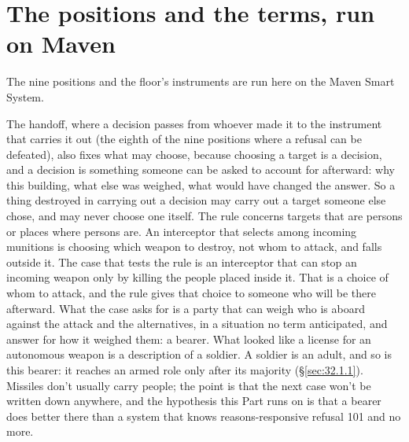 \section{The positions and the terms, run on Maven}
\label{sec:19.4}
The nine positions and the floor's instruments are run here on the Maven Smart System.


The handoff, where a decision passes from whoever made it to the instrument that carries it out (the eighth of the nine positions where a refusal can be defeated), also fixes what may choose, because choosing a target is a decision, and a decision is something someone can be asked to account for afterward: why this building, what else was weighed, what would have changed the answer.
So a thing destroyed in carrying out a decision may carry out a target someone else chose, and may never choose one itself. The rule concerns targets that are persons or places where persons are. An interceptor that selects among incoming munitions is choosing which weapon to destroy, not whom to attack, and falls outside it.
The case that tests the rule is an interceptor that can stop an incoming weapon only by killing the people placed inside it. That is a choice of whom to attack, and the rule gives that choice to someone who will be there afterward. What the case asks for is a party that can weigh who is aboard against the attack and the alternatives, in a situation no term anticipated, and answer for how it weighed them: a bearer. What looked like a license for an autonomous weapon is a description of a soldier. A soldier is an adult, and so is this bearer: it reaches an armed role only after its majority (\S\ref{sec:32.1.1}). Missiles don't usually carry people; the point is that the next case won't be written down anywhere, and the hypothesis this Part runs on is that a bearer does better there than a system that knows reasons-responsive refusal 101 and no more.

